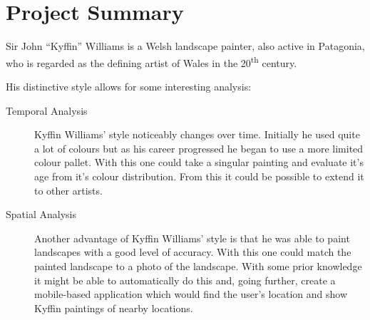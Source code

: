\documentclass[11pt,fleqn,twoside]{article}
\begin{document}

\mmp

\setcounter{tocdepth}{3} %
\tableofcontents

\newpage

\section{Project Summary}
Sir John ``Kyffin'' Williams is a Welsh landscape painter, also active in Patagonia, who is regarded as the defining artist of Wales in the 20\textsuperscript{th} century.

His distinctive style allows for some interesting analysis:

\begin{description}
\item[Temporal Analysis] Kyffin Williams' style noticeably changes over time. Initially he used quite a lot of colours but as his career progressed he began to use a more limited colour pallet. With this one could take a singular painting and evaluate it's age from it's colour distribution. From this it could be possible to extend it to other artists.
\item[Spatial Analysis] Another advantage of Kyffin Williams' style is that he was able to paint landscapes with a good level of accuracy. With this one could match the painted landscape to a photo of the landscape. With some prior knowledge it might be able to automatically do this and, going further, create a mobile-based application which would find the user's location and show Kyffin paintings of nearby locations.
\end{description}
\end{document}
